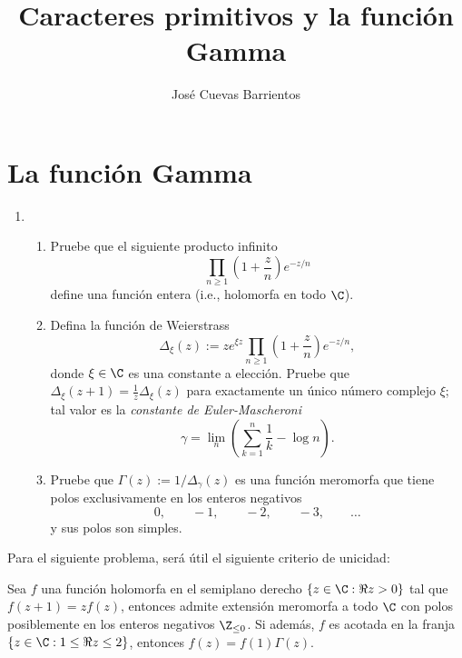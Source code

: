 \documentclass[11pt, reqno]{amsart}
\title{Caracteres primitivos y la función Gamma}
\date{\DTMdate{2025-10-03}}
\author[José Cuevas]{José Cuevas Barrientos}
\begin{document}
\maketitle

\section{La función Gamma}
\begin{enumerate}
	\item
		\begin{enumerate}
			\item Pruebe que el siguiente producto infinito
				\[
					\prod_{n \ge 1} \left( 1 + \frac{z}{n} \right) e^{-z/n}
				\]
				define una función entera (i.e., holomorfa en todo $\C$).

			\item Defina la función de Weierstrass
				\[
					\Delta_\xi(z) := z e^{\xi z} \prod_{n \ge 1} \left( 1 + \frac{z}{n} \right) e^{-z/n},
				\]
				donde $\xi \in \C$ es una constante a elección.
				Pruebe que $\Delta_\xi(z + 1) = \frac{1}{z} \Delta_\xi(z)$ para exactamente un único número complejo $\xi$;
				tal valor es la \emph{constante de Euler-Mascheroni}
				\[
					\gamma = \lim_n \left( \sum_{k=1}^{n} \frac{1}{k} - \log n \right).
				\]

			\item Pruebe que $\Gamma(z) := 1/\Delta_\gamma(z)$ es una función meromorfa que tiene polos exclusivamente en los enteros negativos
				\[
					0, \qquad -1, \qquad -2, \qquad -3, \qquad \dots
				\]
				y sus polos son simples.
		\end{enumerate}
\end{enumerate}
Para el siguiente problema, será útil el siguiente criterio de unicidad:
\begin{thm}[Wielandt]
	Sea $f$ una función holomorfa en el semiplano derecho $\{ z \in \C : \Re z > 0 \}$ tal que $f(z + 1) = zf(z)$, entonces admite
	extensión meromorfa a todo $\C$ con polos posiblemente en los enteros negativos $\Z_{\le 0}$.
	Si además, $f$ es acotada en la franja $\{ z \in \C : 1 \le \Re z \le 2 \}$, entonces $f(z) = f(1) \Gamma(z)$.
\end{thm}
\end{document}
